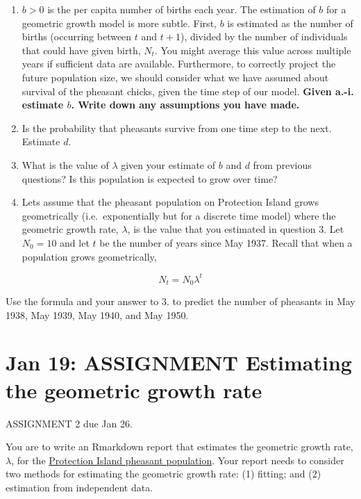 \documentclass[
]{book}
\begin{document}
\begin{enumerate}
\def\labelenumi{\arabic{enumi}.}
\item
  \(b > 0\) is the per capita number of births each year. The estimation of \(b\) for a geometric growth model is more subtle. First, \(b\) is estimated as the number of births (occurring between \(t\) and \(t+1\)), divided by the number of individuals that could have given birth, \(N_t\). You might average this value across multiple years if sufficient data are available. Furthermore, to correctly project the future population size, we should consider what we have assumed about survival of the pheasant chicks, given the time step of our model. \textbf{Given a.-i. estimate \(b\). Write down any assumptions you have made.}
\item
  Is the probability that pheasants survive from one time step to the next. Estimate \(d\).
\item
  What is the value of \(\lambda\) given your estimate of \(b\) and \(d\) from previous questions? Is this population is expected to grow over time?
\item
  Lets assume that the pheasant population on Protection Island grows geometrically (i.e.~exponentially but for a discrete time model) where the geometric growth rate, \(\lambda\), is the value that you estimated in question 3. Let \(N_0 = 10\) and let \(t\) be the number of years since May 1937. Recall that when a population grows geometrically,
\end{enumerate}

\[ N_t = N_0 \lambda^t \]

Use the formula and your answer to 3. to predict the number of pheasants in May 1938, May 1939, May 1940, and May 1950.

\hypertarget{estimate}{%
\chapter{\texorpdfstring{Jan 19: \textbf{ASSIGNMENT} Estimating the geometric growth rate}{Jan 19: ASSIGNMENT Estimating the geometric growth rate}}\label{estimate}}

ASSIGNMENT 2 due Jan 26.

You are to write an Rmarkdown report that estimates the geometric growth rate, \(\lambda\), for the \protect\hyperlink{pheasant}{Protection Island pheasant population}. Your report needs to consider two methods for estimating the geometric growth rate: (1) fitting; and (2) estimation from independent data.
\end{document}
